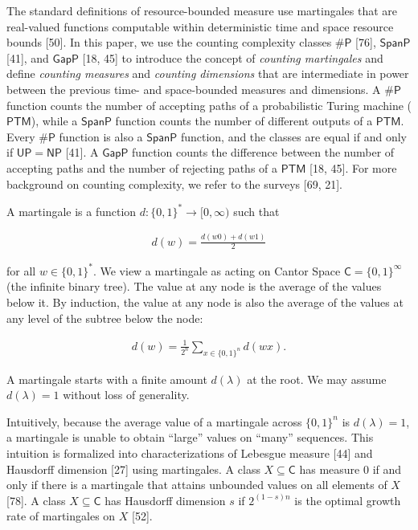 The standard definitions of resource-bounded measure use martingales that are real-valued functions computable within deterministic time and space resource bounds [50].
In this paper, we use the counting complexity classes ${\mathsf{\#}\mathsf{P}}$ [76], $\mathsf{SpanP}$ [41], and $\mathsf{GapP}$ [18, 45]
to introduce the concept of \emph{counting martingales} and define \emph{counting measures} and \emph{counting dimensions} that are intermediate in power between the previous time- and space-bounded measures and dimensions. A ${\mathsf{\#}\mathsf{P}}$ function counts the number of accepting paths of a probabilistic Turing machine ($\mathsf{PTM}$), while a $\mathsf{SpanP}$ function counts the number of different outputs of a $\mathsf{PTM}$. Every ${\mathsf{\#}\mathsf{P}}$ function is also a $\mathsf{SpanP}$ function, and the classes are equal if and only if $\mathsf{UP}=\mathsf{NP}$ [41].
A $\mathsf{GapP}$ function counts the difference between the number of accepting paths and the number of rejecting paths of a $\mathsf{PTM}$ [18, 45]. For more background on counting complexity, we refer to the surveys [69, 21].\par




A martingale is
a function $d:\{0,1\}^{*}\to[0,\infty)$ such that\par


\[\begin{gathered}
d(w)=\frac{d(w0)+d(w1)}{2}
\end{gathered}\]


for all $w\in\{0,1\}^{*}$.
We view a martingale as acting on Cantor Space $\mathsf{C}=\{0,1\}^{\infty}$ (the infinite binary tree). The value at any node is the average of the values below it. By induction, the value at any node is also the average of the values at any level of the subtree below the node:\par


\[\begin{gathered}
d(w)=\frac{1}{2^{n}}\sum_{x\in\{0,1\}^{n}}d(wx).
\end{gathered}\]


A martingale starts with a finite amount $d(\lambda)$ at the root. We may assume $d(\lambda)=1$ without loss of generality.\par




Intuitively, because the average value of a martingale across $\{0,1\}^{n}$ is $d(\lambda)=1$, a martingale is unable to obtain “large” values on “many” sequences. This intuition is formalized into characterizations of
Lebesgue measure [44] and Hausdorff dimension [27] using martingales. A class $X\subseteq\mathsf{C}$ has measure 0 if and only if there is a martingale that attains unbounded values on all elements of $X$ [78]. A class $X\subseteq\mathsf{C}$ has Hausdorff dimension $s$ if $2^{(1-s)n}$ is the optimal growth rate of martingales on $X$ [52].\par




